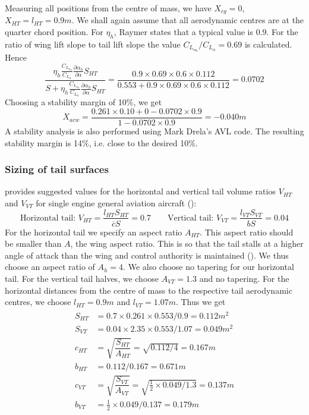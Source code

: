 Measuring all positions from the centre of mass, we have $X_{cg}=0$, $X_{HT}=l_{HT}=0.9\si{m}$. We shall again assume that all aerodynamic centres are at the quarter chord position. For $\eta_h$, Raymer states that a typical value is $0.9$. For the ratio of wing lift slope to tail lift slope the value $C_{L_{\alpha_h}}/C_{L_\alpha}=0.69$ is calculated. Hence
\begin{equation}
  \dfrac{\eta_h\frac{C_{L_{\alpha_h}}}{C_{L_\alpha}}\frac{\partial\alpha_h}{\partial\alpha}S_{HT}}{S+\eta_h\frac{C_{L_{\alpha_h}}}{C_{L_\alpha}}\frac{\partial\alpha_h}{\partial\alpha}S_{HT}}=\dfrac{0.9\times 0.69\times 0.6\times 0.112}{0.553+0.9\times 0.69\times 0.6\times 0.112}=0.0702
\end{equation}
Choosing a stability margin of 10\%, we get
\begin{equation}
  X_{acw}=\dfrac{0.261\times 0.10+0-0.0702\times 0.9} {1-0.0702\times 0.9}=-0.040\si{m}
\end{equation}
A stability analysis is also performed using Mark Drela's AVL code. The resulting stability margin is 14\%, i.e. close to the desired 10\%.

\subsubsection{Sizing of tail surfaces}
\cite{raymer} provides suggested values for the horizontal and vertical tail volume ratios $V_{HT}$ and $V_{VT}$ for single engine general aviation aircraft (\cite[p. 112]{raymer}):
\begin{equation}
  \text{Horizontal tail: } V_{HT}=\dfrac{l_{HT}S_{HT}}{\overline{c}S}=0.7 \qquad \text{Vertical tail: } V_{VT}=\dfrac{l_{VT}S_{VT}}{bS}=0.04
\end{equation}
For the horizontal tail we specify an aspect ratio $A_{HT}$. This aspect ratio should be smaller than $A$, the wing aspect ratio. This is so that the tail stalls at a higher angle of attack than the wing and control authority is maintained (\cite[p. 438]{anderson}). We thus choose an aspect ratio of $A_h=4$. We also choose no tapering for our horizontal tail. For the vertical tail halves, we choose $A_{VT}=1.3$ and no tapering. For the horizontal distances from the centre of mass to the respective tail aerodynamic centres, we choose $l_{HT}=0.9\si{m}$ and $l_{VT}=1.07\si{m}$. Thus we get
\begin{align}
  \begin{split}
    S_{HT}&=0.7\times 0.261\times 0.553/0.9=0.112\si{m^2} \\
    S_{VT}&=0.04\times 2.35\times 0.553/1.07=0.049\si{m^2} \\
    c_{HT}&=\sqrt{\dfrac{S_{HT}}{A_{HT}}}=\sqrt{0.112/4}=0.167\si{m} \\
    b_{HT}&=0.112/0.167=0.671\si{m} \\
    c_{VT}&=\sqrt{\dfrac{S_{VT}}{A_{VT}}}=\sqrt{\frac{1}{2}\times 0.049/1.3}=0.137\si{m} \\
    b_{VT}&=\frac{1}{2}\times 0.049/0.137=0.179\si{m} \\
  \end{split}
\end{align}

